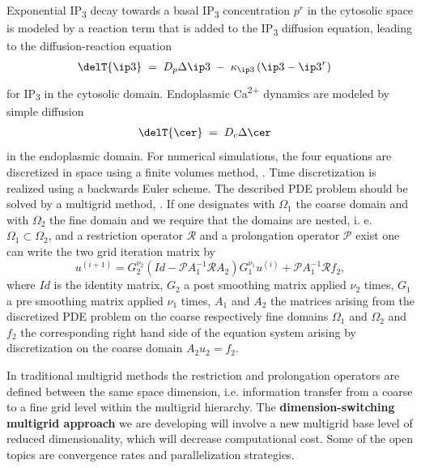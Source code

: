 \noindent Exponential IP\textsubscript{3} decay towards a basal IP\textsubscript{3} concentration
$p^r$ in the cytosolic space is modeled by a reaction term that is added to the
IP\textsubscript{3} diffusion equation, leading to the diffusion-reaction equation
\begin{align}
  \delT{\ip3} & \;=\; D_p\Delta\ip3 \;-\; \kappa_{\ip3}\left(\ip3-{\ip3}^{r}\right)
\end{align}
for IP\textsubscript{3} in the cytosolic domain.
Endoplasmic Ca\textsuperscript{2+} dynamics are modeled by simple diffusion
\begin{align}
  \delT{\cer} & \;=\; D_{c}\Delta\cer
\end{align}
in the endoplasmic domain. For numerical simulations, the four equations are
discretized in space using a finite volumes method, \cite{Eymard2000}.
Time discretization is realized using a backwards Euler scheme. The described PDE problem
should be solved by a multigrid method, \cite{Brandt1977,Fedorenko1962,Hackbusch1976,Ruge1987}.
 If one designates with $\Omega_1$ the coarse domain and with $\Omega_2$ the fine
 domain and we require that the domains are nested, i. e. $\Omega_1 \subset \Omega_2$, and a restriction
operator $\mathcal{R}$ and a prolongation operator $\mathcal{P}$ exist one
can write the two grid iteration matrix by
\begin{equation}
u^{(i+1)} = G_2^{\nu_2}(Id - \mathcal{P}A_1^{-1}\mathcal{R}A_2)G_1^{\nu_1} u^{(i)} + \mathcal{P} A_1^{-1}\mathcal{R}f_2,
\end{equation}
where $Id$ is the identity matrix, $G_2$ a post smoothing matrix applied $\nu_2$ times, $G_1$ a pre smoothing matrix
applied $\nu_1$ times, $A_1$ and $A_2$ the matrices arising from the discretized PDE problem on the coarse respectively
fine domains $\Omega_1$ and $\Omega_2$ and $f_2$ the corresponding right hand side of the equation system arising by
discretization on the coarse domain $A_2 u_2 = f_2$. 

In traditional multigrid methods the restriction and prolongation operators are defined
between the same space dimension, i.e. information transfer from a coarse to a fine
grid level within the multigrid hierarchy. The \textbf{dimension-switching multigrid approach} 
we are developing will involve a new multigrid base level of reduced dimensionality, 
which will decrease computational cost. Some of the open topics are convergence rates and parallelization strategies.


